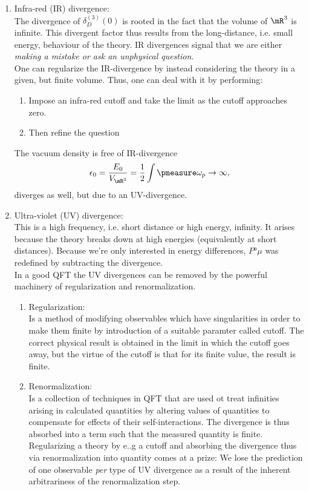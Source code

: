 \begin{enumerate}
	\item Infra-red (IR) divergence:\\
	The divergence of $\delta^{(3)}_D(0)$ is rooted in the fact that the volume of $\mR^3$ is infinite. This divergent factor thus results from the long-distance, i.e. small energy, behaviour of the theory. IR divergences signal that we are either \emph{making a mistake or ask an unphysical question.}\\
	One can regularize the IR-divergence by instead considering the theory in a given, but finite volume. Thus, one can deal with it by performing:
	\begin{enumerate}
		\item Impose an infra-red cutoff and take the limit as the cutoff approaches zero.
		\item Then refine the question
	\end{enumerate}
The vacuum density is free of IR-divergence
\begin{equation}
 \epsilon_0 = \frac{E_0}{V_{\mR^3}} = \frac{1}{2} \int \pmeasure \omega_p \rightarrow \infty,
\end{equation}
diverges as well, but due to an UV-divergence.
\item Ultra-violet (UV) divergence:\\
This is a high frequency, i.e. short distance or high energy, infinity. It arises because the theory breaks down at high energies (equivalently at short distances). Because we're only interested in energy differences, $P°{\mu}$ was redefined by subtracting the divergence.\\
In a good QFT the UV divergences can be removed by the powerful machinery of regularization and renormalization.
\begin{enumerate}
	\item Regularization:\\
	Is a method of modifying observables which have singularities in order to make them finite by introduction of a suitable paramter called cutoff. The correct physical result is obtained in the limit in which the cutoff goes away, but the virtue of the cutoff is that for its finite value, the result is finite.
	\item Renormalization:\\
	Is a collection of techniques in QFT that are used ot treat infinities arising in calculated quantities by altering values of quantities to compensate for effects of their self-interactions. The divergence is thus absorbed into a term such that the measured quantity is finite. Regularizing a theory by e..g a cutoff and absorbing the divergence thus via renormalization into quantity comes at a prize: We lose the prediction of one observable \emph{per} type of UV divergence as a result of the inherent arbitrariness of the renormalization step.

\end{enumerate}
\end{enumerate}
